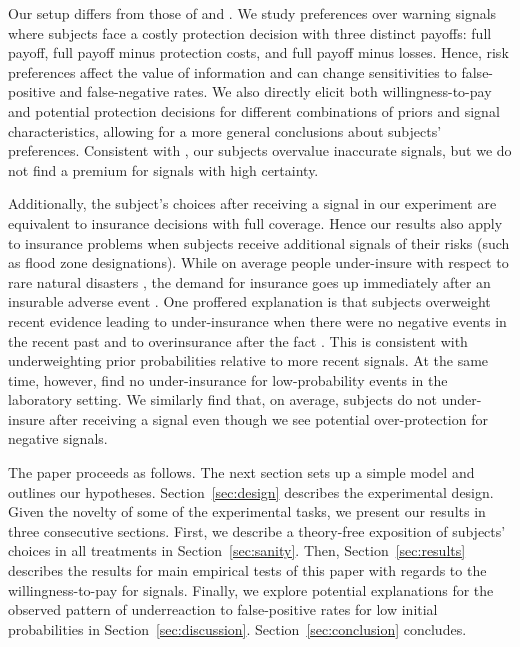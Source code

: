 \documentclass[12pt,a4paper]{article}
\begin{document}
Our setup differs from those of \citet{ambuehl_belief_2018} and \citet{xu_revealed_2022}. We study preferences over warning signals where subjects face a costly protection decision with three distinct payoffs: full payoff, full payoff minus protection costs, and full payoff minus losses. Hence, risk preferences affect the value of information and can change sensitivities to false-positive and false-negative rates. We also directly elicit both willingness-to-pay and potential protection decisions for different combinations of priors and signal characteristics, allowing for a more general conclusions about subjects' preferences. Consistent with \citet{ambuehl_belief_2018}, our subjects overvalue inaccurate signals, but we do not find a premium for signals with high certainty.  

Additionally, the subject's choices after receiving a signal in our experiment are equivalent to insurance decisions with full coverage. Hence our results also apply to insurance problems when subjects receive additional signals of their risks (such as flood zone designations). While on average people under-insure with respect to rare natural disasters \citep{friedl_insurance_2014}, the demand for insurance goes up immediately after an insurable adverse event \citep[e.g.,][]{kousky_understanding_2011}. One proffered explanation is that subjects overweight recent evidence leading to under-insurance when there were no negative events in the recent past and to overinsurance after the fact \citep{volkman-wise_representativeness_2015}. This is consistent with underweighting prior probabilities relative to more recent signals. At the same time, however, \citet{laury_insurance_2009} find no under-insurance for low-probability events in the laboratory setting.  We similarly find that, on average, subjects do not under-insure after receiving a signal even though we see potential over-protection for negative signals.

The paper proceeds as follows. The next section sets up a simple model and outlines our hypotheses. Section~\ref{sec:design} describes the experimental design. Given the novelty of some of the experimental tasks, we present our results in three consecutive sections. First, we describe a theory-free exposition of subjects' choices in all treatments in Section~\ref{sec:sanity}. Then, Section~\ref{sec:results} describes the results for main empirical tests of this paper with regards to the willingness-to-pay for signals. Finally, we explore potential explanations for the observed pattern of underreaction to false-positive rates for low initial probabilities in Section~\ref{sec:discussion}. Section~\ref{sec:conclusion} concludes. 
\end{document}
